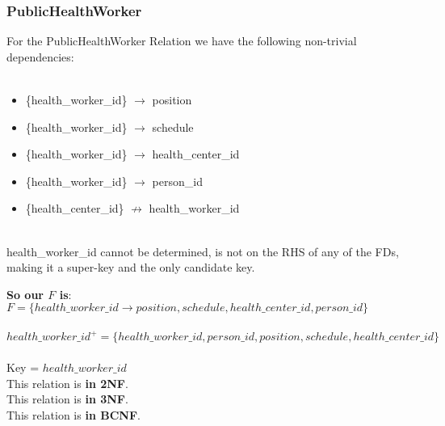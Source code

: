 \subsubsection{PublicHealthWorker}
For the PublicHealthWorker Relation we have the following non-trivial dependencies:\\
\\
\begin{minipage}{\textwidth}
\begin{itemize}
    \item \{health\_worker\_id\} $\rightarrow$ position
    \item\{health\_worker\_id\}  $\rightarrow$ schedule
    \item \{health\_worker\_id\}  $\rightarrow$ health\_center\_id
    \item \{health\_worker\_id\}  $\rightarrow$ person\_id
    \item \{health\_center\_id\}  $\not \rightarrow$ health\_worker\_id\\
\end{itemize}
\end{minipage}
\\
health\_worker\_id cannot be determined, is not on the RHS of any of the FDs, making it a super-key and the only candidate key.
\begin{tcolorbox}
    \textbf{So our $F$ is}:
$F = \{health\_worker\_id \rightarrow position, schedule, health\_center\_id, person\_id\}$\\
\\
$health\_worker\_id^+ = \{health\_worker\_id, person\_id, position, schedule, health\_center\_id \}$\\
\\
Key = $health\_worker\_id$\\
This relation is \textbf{in 2NF}.\\
This relation is \textbf{in 3NF}.\\
This relation is \textbf{in BCNF}.
\end{tcolorbox}

